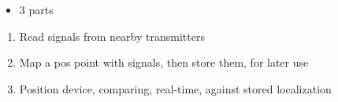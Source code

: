 \begin{itemize}
\item 3 parts
\end{itemize}

\begin{enumerate}
\item Read signals from nearby transmitters
\item Map a pos point with signals, then store them, for later use
\item Position device, comparing, real-time, against stored localization
\end{enumerate}
